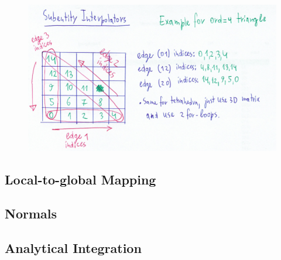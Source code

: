 \begin{figure}[hp]
    \centering
    \includegraphics[scale=0.5]{doc-pics/pic-subentity-interpolators-method.png}
\end{figure}


\subsection{Local-to-global Mapping}

\subsection{Normals}

\subsection{Analytical Integration}